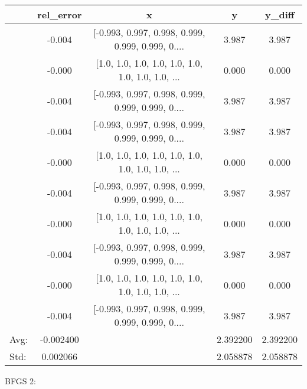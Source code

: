 \documentclass[10pt,onside]{article}
\begin{document}
\begin{description}
\begin{tabular}{lcccc}
\toprule
{} &  rel\_error &                                                  x &      y &  y\_diff \\
\midrule
&     -0.004 &  [-0.993, 0.997, 0.998, 0.999, 0.999, 0.999, 0.... &  3.987 &   3.987 \\
&     -0.000 &  [1.0, 1.0, 1.0, 1.0, 1.0, 1.0, 1.0, 1.0, 1.0, ... &  0.000 &   0.000 \\
&     -0.004 &  [-0.993, 0.997, 0.998, 0.999, 0.999, 0.999, 0.... &  3.987 &   3.987 \\
&     -0.004 &  [-0.993, 0.997, 0.998, 0.999, 0.999, 0.999, 0.... &  3.987 &   3.987 \\
&     -0.000 &  [1.0, 1.0, 1.0, 1.0, 1.0, 1.0, 1.0, 1.0, 1.0, ... &  0.000 &   0.000 \\
&     -0.004 &  [-0.993, 0.997, 0.998, 0.999, 0.999, 0.999, 0.... &  3.987 &   3.987 \\
&     -0.000 &  [1.0, 1.0, 1.0, 1.0, 1.0, 1.0, 1.0, 1.0, 1.0, ... &  0.000 &   0.000 \\
&     -0.004 &  [-0.993, 0.997, 0.998, 0.999, 0.999, 0.999, 0.... &  3.987 &   3.987 \\
&     -0.000 &  [1.0, 1.0, 1.0, 1.0, 1.0, 1.0, 1.0, 1.0, 1.0, ... &  0.000 &   0.000 \\
&     -0.004 &  [-0.993, 0.997, 0.998, 0.999, 0.999, 0.999, 0.... &  3.987 &   3.987 \\
\bottomrule
Avg: & -0.002400 &  & 2.392200 &  2.392200\\
Std: & 0.002066 &  & 2.058878 & 2.058878 \\
\bottomrule
\end{tabular}

BFGS 2:


\end{description}
\end{document}
